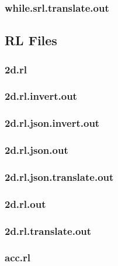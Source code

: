 \subsubsection{while.srl.translate.out}
\label{app:while_srl.translate.out}

\subsection{RL Files}
\label{app:test_rl_files}
\subsubsection{2d.rl}
\label{app:2d_rl}

\subsubsection{2d.rl.invert.out}
\label{app:2d_rl.invert.out}

\subsubsection{2d.rl.json.invert.out}
\label{app:2d_rl.json.invert.out}

\subsubsection{2d.rl.json.out}
\label{app:2d_rl.json.out}

\subsubsection{2d.rl.json.translate.out}
\label{app:2d_rl.json.translate.out}

\subsubsection{2d.rl.out}
\label{app:2d_rl.out}

\subsubsection{2d.rl.translate.out}
\label{app:2d_rl.translate.out}

\subsubsection{acc.rl}
\label{app:acc_rl}


